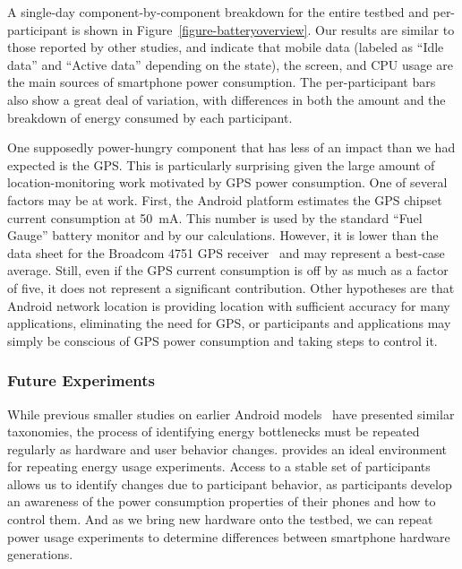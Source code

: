 A single-day component-by-component breakdown for the entire testbed and
per-participant is shown in Figure~\ref{figure-batteryoverview}. Our results are
similar to those reported by other studies, and indicate that mobile data
(labeled as ``Idle data'' and ``Active data'' depending on the state), the
screen, and CPU usage are the main sources of smartphone power consumption. The
per-participant bars also show a great deal of variation, with differences in
both the amount and the breakdown of energy consumed by each participant.

One supposedly power-hungry component that has less of an impact than we had
expected is the GPS. This is particularly surprising given the large amount
of location-monitoring work motivated by GPS power consumption. One of
several factors may be at work. First, the Android platform estimates the GPS
chipset current consumption at 50~mA. This number is used by the standard
``Fuel Gauge'' battery monitor and by our calculations. However, it is lower
than the data sheet for the Broadcom 4751 GPS receiver~\cite{bcm4751} and may
represent a best-case average. Still, even if the GPS current consumption is
off by as much as a factor of five, it does not represent a significant
contribution. Other hypotheses are that Android network location is providing
location with sufficient accuracy for many applications, eliminating the need
for GPS, or participants and applications may simply be conscious of GPS
power consumption and taking steps to control it.

\subsubsection{Future Experiments}

While previous smaller studies on earlier Android
models~\cite{shye:micro:2009} have presented similar taxonomies, the process
of identifying energy bottlenecks must be repeated regularly as hardware and
user behavior changes. \PhoneLab{} provides an ideal environment for
repeating energy usage experiments. Access to a stable set of participants
allows us to identify changes due to participant behavior, as participants
develop an awareness of the power consumption properties of their phones and
how to control them. And as we bring new hardware onto the testbed, we can
repeat power usage experiments to determine differences between smartphone
hardware generations.
